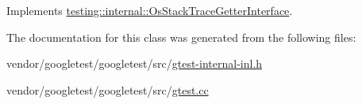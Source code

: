 Implements \hyperlink{classtesting_1_1internal_1_1_os_stack_trace_getter_interface_a791bd120428b5a53d5eeba1b27296a39}{testing\+::internal\+::\+Os\+Stack\+Trace\+Getter\+Interface}.



The documentation for this class was generated from the following files\+:\begin{DoxyCompactItemize}
\item 
vendor/googletest/googletest/src/\hyperlink{gtest-internal-inl_8h}{gtest-\/internal-\/inl.\+h}\item 
vendor/googletest/googletest/src/\hyperlink{gtest_8cc}{gtest.\+cc}\end{DoxyCompactItemize}
